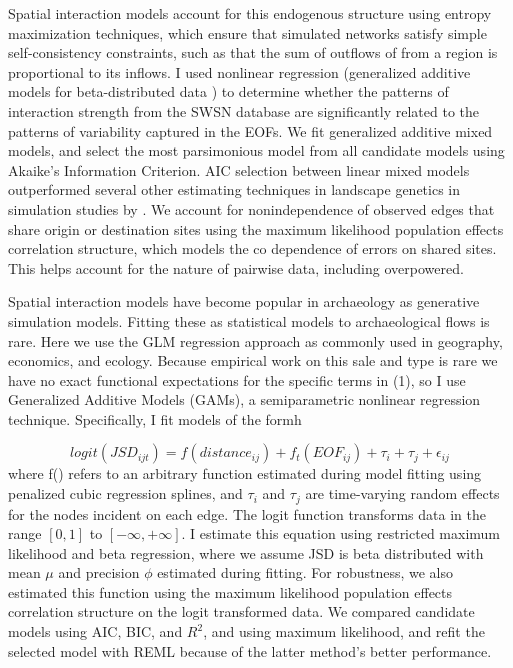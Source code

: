 \documentclass[11pt]{wlscirep}
\begin{document}
Spatial interaction models account for this endogenous structure using entropy maximization techniques, which ensure that simulated networks satisfy simple self-consistency constraints, such as that the sum of outflows of from a region is proportional to its inflows.
I used nonlinear regression (generalized additive models for beta-distributed data \cite{Wood2006a}) to determine whether the patterns of interaction strength from the SWSN database are significantly related to the patterns of variability captured in the EOFs.
We fit generalized additive mixed models, and select the most parsimonious model from all candidate models using Akaike's Information Criterion. AIC selection between linear mixed models outperformed several other estimating techniques in landscape genetics in simulation studies by \cite{Shirk et al 2018}. We account for nonindependence of observed edges that share origin or destination sites using the maximum likelihood population effects correlation structure, which models the co dependence of errors on shared sites. This helps account for the nature of pairwise data, including overpowered.

Spatial interaction models have become popular in archaeology as generative simulation models. Fitting these as statistical models to archaeological flows is rare. Here we use the GLM regression approach as commonly used in geography, economics, and ecology. Because empirical work on this sale and type is rare we have no exact functional expectations for the specific terms in (1), so I use Generalized Additive Models (GAMs), a semiparametric nonlinear regression technique. Specifically, I fit models of the formh

\begin{equation}
    logit\left(JSD_{ijt}\right) = f(distance_{ij}) + f_t(EOF_{ij}) + \tau_i + \tau_j + \epsilon_{ij}
\end{equation}
where f() refers to an arbitrary function estimated during model fitting using penalized cubic regression splines, and $\tau_i$ and $\tau_j$ are time-varying random effects for the nodes incident on each edge. The logit function transforms data in the range $[0, 1]$ to $[-\infty, +\infty]$. I estimate this equation using restricted maximum likelihood and beta regression, where we assume JSD is beta distributed with mean $\mu$ and precision $\phi$ estimated during fitting. For robustness, we also estimated this function using the maximum likelihood population effects correlation structure on the logit transformed data. We compared candidate models using AIC, BIC, and $R^2$, and using maximum likelihood, and refit the selected model with REML because of the latter method's better performance.
\end{document}

